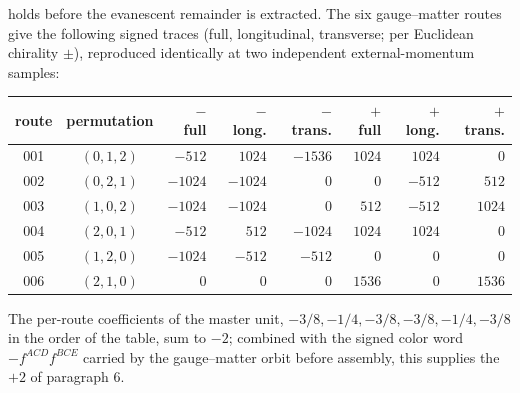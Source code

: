 holds before the evanescent remainder is extracted. The six gauge--matter routes give the following signed traces
(full, longitudinal, transverse; per Euclidean chirality $\pm$), reproduced identically at two independent
external-momentum samples:
\begin{center}
\begin{tabular}{ccrrrrrr}
\hline
route & permutation & $-$ full & $-$ long. & $-$ trans. & $+$ full & $+$ long. & $+$ trans.\\
\hline
001 & $(0,1,2)$ & $-512$  & $1024$  & $-1536$ & $1024$ & $1024$  & $0$\\
002 & $(0,2,1)$ & $-1024$ & $-1024$ & $0$     & $0$    & $-512$  & $512$\\
003 & $(1,0,2)$ & $-1024$ & $-1024$ & $0$     & $512$  & $-512$  & $1024$\\
004 & $(2,0,1)$ & $-512$  & $512$   & $-1024$ & $1024$ & $1024$  & $0$\\
005 & $(1,2,0)$ & $-1024$ & $-512$  & $-512$  & $0$    & $0$     & $0$\\
006 & $(2,1,0)$ & $0$     & $0$     & $0$     & $1536$ & $0$     & $1536$\\
\hline
\end{tabular}
\end{center}
The per-route coefficients of the master unit, $-3/8,-1/4,-3/8,-3/8,-1/4,-3/8$ in the order of the table, sum to
$-2$; combined with the signed color word $-f^{ACD}f^{BCE}$ carried by the gauge--matter orbit before assembly,
this supplies the $+2$ of paragraph 6.

